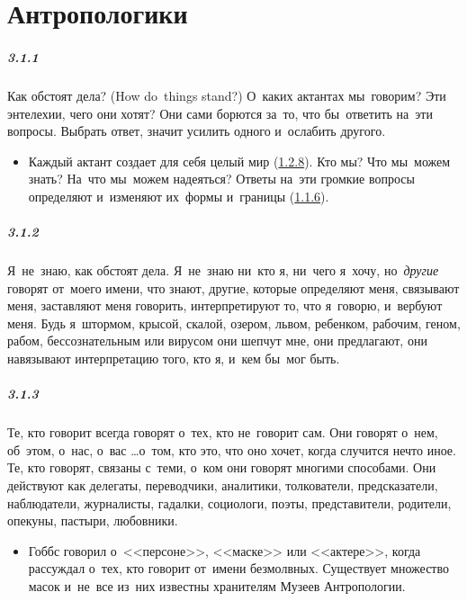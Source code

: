 \chapter{Антропологики}

\paragraph{3.1.1}\hypertarget{par:3.1.1}{} Как обстоят дела? (How do~things stand?) О~каких актантах мы~говорим? Эти энтелехии, чего они хотят? Они сами борются за~то, что бы~ответить на~эти вопросы. Выбрать ответ, значит усилить одного и~ослабить другого. 
	\begin{itemize}
	\item 
	Каждый актант создает для себя целый мир (\hyperlink{par:1.2.8}{1.2.8}). Кто мы? Что мы~можем знать? На~что мы~можем надеяться? Ответы на~эти громкие вопросы определяют и~изменяют их~формы и~границы (\hyperlink{par:1.1.6}{1.1.6}).
	\end{itemize}

\paragraph{3.1.2}\hypertarget{par:3.1.2}{} Я~не~знаю, как обстоят дела. Я~не~знаю ни~кто я, ни~чего я~хочу, но~{\itshape другие} говорят от~моего имени, что знают, другие, которые определяют меня, связывают меня, заставляют меня говорить, интерпретируют то, что я~говорю, и~вербуют меня. Будь я~штормом, крысой, скалой, озером, львом, ребенком, рабочим, геном, рабом, бессознательным или вирусом они шепчут мне, они предлагают, они навязывают интерпретацию того, кто я, и~кем бы~мог быть.


\paragraph{3.1.3}\hypertarget{par:3.1.3}{} Те, кто говорит всегда говорят о~тех, кто не~говорит сам. Они говорят о~нем, об~этом, о~нас, о~вас \ldots о~том, кто это, что оно хочет, когда случится нечто иное. Те, кто говорят, связаны с~теми, о~ком они говорят многими способами. Они действуют как делегаты, переводчики, аналитики, толкователи, предсказатели, наблюдатели, журналисты, гадалки, социологи, поэты, представители, родители, опекуны, пастыри, любовники. 
	\begin{itemize}
	\item 
	Гоббс говорил о~<<персоне>>, <<маске>> или <<актере>>, когда рассуждал о~тех, кто говорит от~имени безмолвных. Существует множество масок и~не~все из~них известны хранителям Музеев Антропологии.
	\end{itemize}

